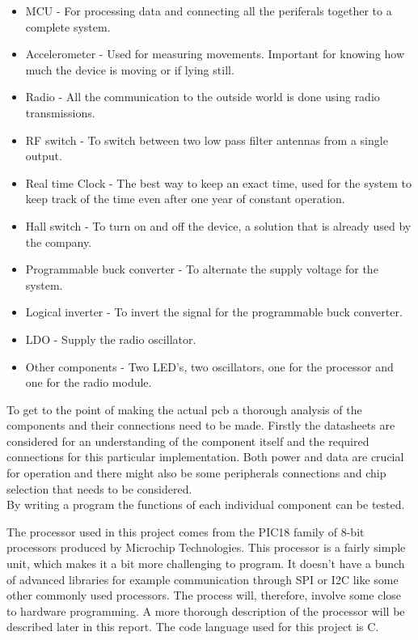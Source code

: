 \begin{itemize}[noitemsep]
	\item MCU - For processing data and connecting all the periferals together to a complete system.
	\item Accelerometer - Used for measuring movements. Important for knowing how much the device is moving or if lying still.
	\item Radio - All the communication to the outside world is done using radio transmissions. 
	\item RF switch - To switch between two low pass filter antennas from a single output.
	\item Real time Clock - The best way to keep an exact time, used for the system to keep track of the time even after one year of constant operation. 
	\item Hall switch - To turn on and off the device, a solution that is already used by the company.
	\item Programmable buck converter - To alternate the supply voltage for the system. 
	\item Logical inverter - To invert the signal for the programmable buck converter.
	\item LDO - Supply the radio oscillator.
	\item Other components - Two LED's, two oscillators, one for the processor and one for the radio module.
\end{itemize}


To get to the point of making the actual \gls{pcb} a thorough analysis of the components and their connections need to be made. Firstly the datasheets are considered for an understanding of the component itself and the required connections for this particular implementation. Both power and data are crucial for operation and there might also be some peripherals connections and chip selection that needs to be considered. \\
By writing a program the functions of each individual component can be tested. 

The processor used in this project comes from the PIC18 family of 8-bit processors produced by Microchip Technologies. This processor is a fairly simple unit, which makes it a bit more challenging to program. It doesn't have a bunch of advanced libraries for example communication through SPI or I2C like some other commonly used processors. The process will, therefore, involve some close to hardware programming. A more thorough description of the processor will be described later in this report. The code language used for this project is C.

\begin{comment}
In some cases the component needs to be initialized in a specific way or it needs some other special attention which might require additional connections than it firstly seemed.
With all the specified components connected together a program is made to show all the functions and that they work as intended. 
To ensure that each component on the PCB works and the prototype can be handed over to the software developers for a more advanced and optimized program. 
\end{comment}

